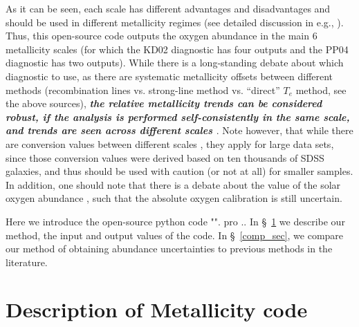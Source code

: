 \documentclass{emulateapj}
\begin{document}
As it can be seen, each scale has different advantages and disadvantages and should be used in different metallicity regimes (see detailed discussion in e.g.,  \citealt{kewley02,stasinska02,kewley08,moustakas10,dopita13,blanc15}). Thus, this open-source code outputs the oxygen abundance in the main 6 metallicity scales (for which the KD02 diagnostic has four outputs and the PP04 diagnostic has two outputs). While there is a long-standing debate about which diagnostic to use, as there are systematic metallicity offsets between different methods (recombination lines vs.  strong-line method vs. ``direct'' $T_e$ method, see the above sources), \emph{\bf the relative metallicity trends can be considered robust, if the analysis is performed self-consistently in the same scale, and trends are seen across different scales \citep{kewley08,moustakas10}}. Note however, that while there are conversion values between different scales \citep{kewley08}, they apply for large data sets, since those conversion values were derived based on ten thousands of SDSS galaxies, and thus should be used with caution (or not at all) for smaller samples. In addition, one should note that there is a debate about the value of the solar oxygen abundance \citep{asplund09_rev,chaffau11}, such that the absolute oxygen calibration is still uncertain.




Here we introduce the open-source python code "". pro .. In \S~\ref{method_sec} we describe our method, the input and output values of the code. In \S~\ref{comp_sec}, we compare our method of obtaining abundance uncertainties to previous methods in the literature. 


\section{Description of Metallicity code}\label{method_sec}
\end{document}
